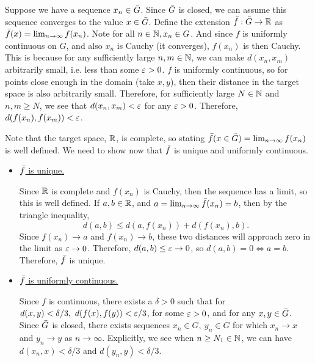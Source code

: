\partbreak
\begin{solution}

    Suppose we have a sequence $x_n \in \Bar{G}$. Since $\Bar{G}$ is closed, we can assume this sequence converges to the value $x \in \Bar{G}$. Define the extension $\Bar{f} : \Bar{G} \rightarrow \mathbb{R}$ as $\Bar{f} (x) = \lim_{n \rightarrow \infty} f(x_n)$. Note for all $n \in \mathbb{N}, x_n \in G$. And since $f$ is uniformly continuous on $G$, and also $x_n$ is Cauchy (it converges), $f(x_n)$ is then Cauchy. This is because for any sufficiently large $n, m \in \mathbb{N}$, we can make $d(x_n, x_m)$ arbitrarily small, i.e. less than some $\varepsilon > 0$. $f$ is uniformly continuous, so for points close enough in the domain (take $x, y$), then their distance in the target space is also arbitrarily small. Therefore, for sufficiently large $N \in \mathbb{N}$ and $n, m \geq N$, we see that $d(x_n, x_m) < \varepsilon$ for any $\varepsilon > 0$. Therefore, $d(f(x_n), f(x_m)) < \varepsilon$. \par

    \jump
    Note that the target space, $\mathbb{R}$, is complete, so stating $\Bar{f}(x \in \Bar{G}) = \lim_{n\rightarrow \infty} f(x_n)$ is well defined. We need to show now that $\Bar{f}$ is unique and uniformly continuous. 

    \tightalignbreak
    \begin{itemize}[-]
        \item \underline{$\Bar{f}$ is unique.}

        \jump
        Since $\mathbb{R}$ is complete and $f(x_n)$ is Cauchy, then the sequence has a limit, so this is well defined. If $a, b \in \mathbb{R}$, and $a = \lim_{n \rightarrow \infty} \Bar{f}(x_n) = b$, then by the triangle inequality, 
        \[d(a, b) \leq d(a, f(x_n)) + d(f(x_n), b).\]
        Since $f(x_n) \rightarrow a$ and $f(x_n) \rightarrow b$, these two distances will approach zero in the limit as $\varepsilon \rightarrow 0$. Therefore, $d(a, b) \leq \varepsilon \rightarrow 0$, so $d(a, b) = 0 \iff a = b$. Therefore, $\Bar{f}$ is unique.

        \item \underline{$\Bar{f}$ is uniformly continuous.}

        \jump
        Since $f$ is continuous, there exists a $\delta > 0$ such that for $d(x, y) < \delta / 3, \ d(f(x), f(y)) < \ep / 3$, for some $\varepsilon > 0$, and for any $x, y \in \Bar{G}$. Since $\Bar{G}$ is closed, there exists sequences $x_n \in G, \ y_n \in G$ for which $x_n \rightarrow x$ and $y_n \rightarrow y$ as $n \rightarrow \infty$. Explicitly, we see when $n \geq N_1 \in \mathbb{N}$, we can have $d(x_n, x) < \delta / 3$ and $d(y_n, y) < \delta / 3$. \par


\end{itemize}
\end{solution}
